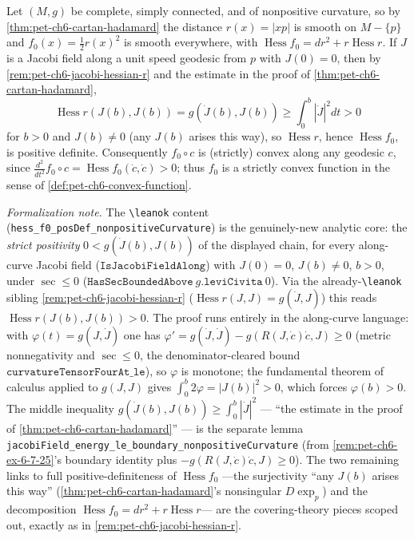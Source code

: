\begin{remark}
  \label{rem:pet-ch6-hessian-f0-positive-definite}


  Let $(M,g)$ be complete, simply connected, and of nonpositive curvature, so
  by \cref{thm:pet-ch6-cartan-hadamard} the distance $r(x)=|xp|$ is smooth on
  $M-\{p\}$ and $f_0(x)=\tfrac12r(x)^2$ is smooth everywhere, with
  $\operatorname{Hess}f_0=dr^2+r\operatorname{Hess}r$. If $J$ is a Jacobi field along a unit
  speed geodesic from $p$ with $J(0)=0$, then by
  \cref{rem:pet-ch6-jacobi-hessian-r} and the estimate in the proof of
  \cref{thm:pet-ch6-cartan-hadamard},
  \[
    \operatorname{Hess}r(J(b),J(b))=g(\dot J(b),J(b))\ge\int_0^b|\dot J|^2dt>0
  \]
  for $b>0$ and $J(b)\ne0$ (any $J(b)$ arises this way), so $\operatorname{Hess}r$, hence
  $\operatorname{Hess}f_0$, is positive definite. Consequently $f_0\circ c$ is (strictly)
  convex along any geodesic $c$, since
  $\frac{d^2}{dt^2}f_0\circ c=\operatorname{Hess}f_0(\dot c,\dot c)>0$; thus $f_0$ is a
  strictly convex function in the sense of
  \cref{def:pet-ch6-convex-function}.

  \emph{Formalization note.} The \texttt{\textbackslash leanok} content
  (\texttt{hess\_f0\_posDef\_nonpositiveCurvature}) is the genuinely-new analytic
  core: the \emph{strict positivity} $0<g(\dot J(b),J(b))$ of the displayed chain,
  for every along-curve Jacobi field ($\texttt{IsJacobiFieldAlong}$) with $J(0)=0$,
  $J(b)\ne0$, $b>0$, under $\sec\le0$ ($\texttt{HasSecBoundedAbove}\ g.\texttt{leviCivita}\ 0$).
  Via the already-\texttt{\textbackslash leanok} sibling
  \cref{rem:pet-ch6-jacobi-hessian-r} ($\operatorname{Hess}r(J,J)=g(\dot J,J)$) this
  reads $\operatorname{Hess}r(J(b),J(b))>0$. The proof runs entirely in the
  along-curve language: with $\varphi(t)=g(J,\dot J)$ one has
  $\varphi'=g(\dot J,\dot J)-g(R(J,\dot c)\dot c,J)\ge0$ (metric nonnegativity and
  $\sec\le0$, the denominator-cleared bound
  $\texttt{curvatureTensorFourAt\_le}$), so $\varphi$ is monotone; the fundamental
  theorem of calculus applied to $g(J,J)$ gives $\int_0^b2\varphi=|J(b)|^2>0$, which
  forces $\varphi(b)>0$. The middle inequality
  $g(\dot J(b),J(b))\ge\int_0^b|\dot J|^2$ — ``the estimate in the proof of
  \cref{thm:pet-ch6-cartan-hadamard}'' — is the separate lemma
  \texttt{jacobiField\_energy\_le\_boundary\_nonpositiveCurvature} (from
  \cref{rem:pet-ch6-ex-6-7-25}'s boundary identity plus $-g(R(J,\dot c)\dot c,J)\ge0$).
  The two remaining links to full positive-definiteness of $\operatorname{Hess}f_0$
  ---the surjectivity ``any $J(b)$ arises this way'' (\cref{thm:pet-ch6-cartan-hadamard}'s
  nonsingular $D\exp_p$) and the decomposition $\operatorname{Hess}f_0=dr^2+r\operatorname{Hess}r$---
  are the covering-theory pieces scoped out, exactly as in
  \cref{rem:pet-ch6-jacobi-hessian-r}.
\end{remark}

